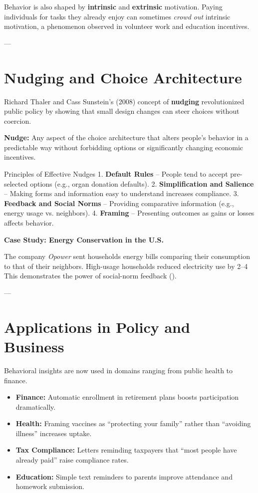 \documentclass[11pt]{book}
\begin{document}
Behavior is also shaped by \textbf{intrinsic} and \textbf{extrinsic} motivation. Paying individuals for tasks they already enjoy can sometimes \textit{crowd out} intrinsic motivation, a phenomenon observed in volunteer work and education incentives.

---

\section*{Nudging and Choice Architecture}

Richard Thaler and Cass Sunstein’s (2008) concept of \textbf{nudging} revolutionized public policy by showing that small design changes can steer choices without coercion.

\begin{definitionbox}
\textbf{Nudge:} Any aspect of the choice architecture that alters people’s behavior in a predictable way without forbidding options or significantly changing economic incentives.
\end{definitionbox}

Principles of Effective Nudges
1. \textbf{Default Rules} – People tend to accept pre-selected options (e.g., organ donation defaults).  
2. \textbf{Simplification and Salience} – Making forms and information easy to understand increases compliance.  
3. \textbf{Feedback and Social Norms} – Providing comparative information (e.g., energy usage vs. neighbors).  
4. \textbf{Framing} – Presenting outcomes as gains or losses affects behavior.

\begin{casebox}
\textbf{Case Study: Energy Conservation in the U.S.}  

The company \textit{Opower} sent households energy bills comparing their consumption to that of their neighbors.  
High-usage households reduced electricity use by 2–4 %
This demonstrates the power of social-norm feedback (\citealp{Allcott2011}).
\end{casebox}

---

\section*{Applications in Policy and Business}

Behavioral insights are now used in domains ranging from public health to finance.

\begin{itemize}
\item \textbf{Finance:} Automatic enrollment in retirement plans boosts participation dramatically.  
\item \textbf{Health:} Framing vaccines as ``protecting your family'' rather than ``avoiding illness'' increases uptake.  
\item \textbf{Tax Compliance:} Letters reminding taxpayers that ``most people have already paid'' raise compliance rates.  
\item \textbf{Education:} Simple text reminders to parents improve attendance and homework submission.  
\end{itemize}
\end{document}
